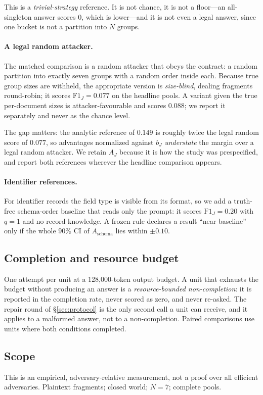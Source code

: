 \documentclass[sigconf,review]{acmart}
\newcommand{\FJ}{\ensuremath{\mathrm{F1}_{J}}}
\newcommand{\bJ}{\ensuremath{b_{J}}}
\newcommand{\AJ}{\ensuremath{A_{J}}}
\newcommand{\Asch}{\ensuremath{A_{\mathrm{schema}}}}
\begin{document}
This is a \emph{trivial-strategy} reference. It is not chance, it is not a
floor---an all-singleton answer scores $0$, which is lower---and it is not even
a legal answer, since one bucket is not a partition into $N$ groups.

\paragraph{A legal random attacker.}
The matched comparison is a random attacker that obeys the contract: a random
partition into exactly seven groups with a random order inside each. Because
true group sizes are withheld, the appropriate version is \emph{size-blind},
dealing fragments round-robin; it scores $\FJ = 0.077$ on the headline pools. A
variant given the true per-document sizes is attacker-favourable and scores
$0.088$; we report it separately and never as the chance level.

The gap matters: the analytic reference of $0.149$ is roughly twice the legal
random score of $0.077$, so advantages normalized against $\bJ$ \emph{understate}
the margin over a legal random attacker. We retain \AJ{} because it is how the
study was prespecified, and report both references wherever the headline
comparison appears.

\paragraph{Identifier references.}
For identifier records the field type is visible from its format, so we add a
truth-free schema-order baseline that reads only the prompt: it scores
$\FJ = 0.20$ with $q = 1$ and no record knowledge. A frozen rule declares a
result ``near baseline'' only if the whole $90\%$ CI of \Asch{} lies within
$\pm 0.10$.

\subsection{Completion and resource budget}
\label{sec:rbnc}
One attempt per unit at a 128{,}000-token output budget. A unit that exhausts
the budget without producing an answer is a \emph{resource-bounded
non-completion}: it is reported in the completion rate, never scored as zero,
and never re-asked. The repair round of \S\ref{sec:protocol} is the only
second call a unit can receive, and it applies to a malformed answer, not to a
non-completion. Paired comparisons use units where both conditions completed.

\subsection{Scope}
\label{sec:scope}
This is an empirical, adversary-relative measurement, not a proof over all
efficient adversaries. Plaintext fragments; closed world; $N=7$; complete pools.
\end{document}
